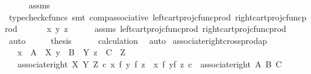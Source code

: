 \begin{isabellebody}
\ \ \ \ \isamarkupfalse%
\ assms\ \isamarkupfalse%
\ {\isacharparenleft}{\kern0pt}typecheck{\isacharunderscore}{\kern0pt}cfuncs{\isacharcomma}{\kern0pt}\ smt\ comp{\isacharunderscore}{\kern0pt}associative{}\ left{\isacharunderscore}{\kern0pt}cart{\isacharunderscore}{\kern0pt}proj{\isacharunderscore}{\kern0pt}cfunc{\isacharunderscore}{\kern0pt}prod\ right{\isacharunderscore}{\kern0pt}cart{\isacharunderscore}{\kern0pt}proj{\isacharunderscore}{\kern0pt}cfunc{\isacharunderscore}{\kern0pt}prod{\isacharparenright}{\kern0pt}\isanewline
\ \ \isamarkupfalse%
\ \isamarkupfalse%
\ {\isachardoublequoteopen}{\isachardot}{\kern0pt}{\isachardot}{\kern0pt}{\isachardot}{\kern0pt}\ {\isacharequal}{\kern0pt}{\isasymlangle}x{\isacharcomma}{\kern0pt}\ {\isasymlangle}y{\isacharcomma}{\kern0pt}\ z{\isasymrangle}{\isasymrangle}{\isachardoublequoteclose}\isanewline
\ \ \ \ \isamarkupfalse%
\ assms\ left{\isacharunderscore}{\kern0pt}cart{\isacharunderscore}{\kern0pt}proj{\isacharunderscore}{\kern0pt}cfunc{\isacharunderscore}{\kern0pt}prod\ right{\isacharunderscore}{\kern0pt}cart{\isacharunderscore}{\kern0pt}proj{\isacharunderscore}{\kern0pt}cfunc{\isacharunderscore}{\kern0pt}prod\ \isamarkupfalse%
\ auto\isanewline
\ \ \isamarkupfalse%
\ \isamarkupfalse%
\ {\isacharquery}{\kern0pt}thesis\isanewline
\ \ \ \ \isamarkupfalse%
\ calculation\ \isamarkupfalse%
\ auto\isanewline
{}\isamarkupfalse%
%
\endisatagproof
{\isafoldproof}%
%
\isadelimproof
\isanewline
%
\endisadelimproof
\isanewline
{}\isamarkupfalse%
\ associate{\isacharunderscore}{\kern0pt}right{\isacharunderscore}{\kern0pt}crossprod{\isacharunderscore}{\kern0pt}ap{\isacharcolon}{\kern0pt}\isanewline
\ \ \ {\isachardoublequoteopen}x\ {\isacharcolon}{\kern0pt}\ A\ {\isasymrightarrow}\ X{\isachardoublequoteclose}\ {\isachardoublequoteopen}y\ {\isacharcolon}{\kern0pt}\ B\ {\isasymrightarrow}\ Y{\isachardoublequoteclose}\ {\isachardoublequoteopen}z\ {\isacharcolon}{\kern0pt}\ C\ {\isasymrightarrow}\ Z{\isachardoublequoteclose}\isanewline
\ \ \ {\isachardoublequoteopen}associate{\isacharunderscore}{\kern0pt}right\ X\ Y\ Z\ {\isasymcirc}\isactrlsub c\ {\isacharparenleft}{\kern0pt}{\isacharparenleft}{\kern0pt}x\ {\isasymtimes}\isactrlsub f\ y{\isacharparenright}{\kern0pt}\ {\isasymtimes}\isactrlsub f\ z{\isacharparenright}{\kern0pt}\ {\isacharequal}{\kern0pt}\ {\isacharparenleft}{\kern0pt}x\ {\isasymtimes}\isactrlsub f\ {\isacharparenleft}{\kern0pt}y{\isasymtimes}\isactrlsub f\ z{\isacharparenright}{\kern0pt}{\isacharparenright}{\kern0pt}\ {\isasymcirc}\isactrlsub c\ \ associate{\isacharunderscore}{\kern0pt}right\ A\ B\ C{\isachardoublequoteclose}\isanewline

\end{isabellebody}
